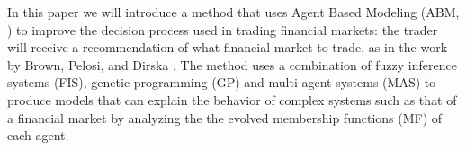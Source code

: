 \documentclass[a4paper,twoside]{article}
\begin{document}


In this paper we will introduce a method that uses Agent Based
Modeling (ABM, \cite{gilbert2008agent}) to improve the
decision process used in trading financial markets: the trader will receive a
recommendation of what financial market to trade, as in the work by
Brown, Pelosi, and Dirska \cite{brown2013dynamic}. The
method uses a combination of fuzzy inference systems (FIS), genetic
programming (GP) \cite{poli2008field} \cite{Koza1992} and multi-agent
systems (MAS) \cite{Shoham2009} to produce models that can explain the
behavior of complex systems such as that of a financial market by
analyzing the the evolved membership functions (MF) of each agent. 
\end{document}
